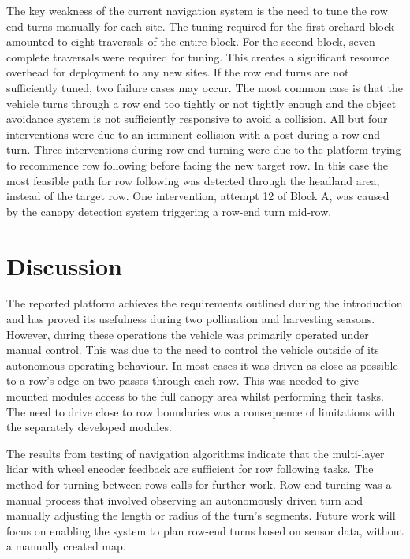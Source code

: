\documentclass[preprint,authoryear,12pt]{elsarticle}
\begin{document}
    The key weakness of the current navigation system is the need to tune the row end turns manually for each site.
    The tuning required for the first orchard block amounted to eight traversals of the entire block.
    For the second block, seven complete traversals were required for tuning.
    This creates a significant resource overhead for deployment to any new sites.
    If the row end turns are not sufficiently tuned, two failure cases may occur.
    The most common case is that the vehicle turns through a row end too tightly or not tightly enough and the object avoidance system is not sufficiently responsive to avoid a collision.
    All but four interventions were due to an imminent collision with a post during a row end turn.
    Three interventions during row end turning were due to the platform trying to recommence row following before facing the new target row.
    In this case the most feasible path for row following was detected through the headland area, instead of the target row.
    One intervention, attempt 12 of Block A, was caused by the canopy detection system triggering a row-end turn mid-row.

\section{Discussion}
\label{sect:discussion}

    The reported platform achieves the requirements outlined during the introduction and has proved its usefulness during two pollination and harvesting seasons.
    However, during these operations the vehicle was primarily operated under manual control.
    This was due to the need to control the vehicle outside of its autonomous operating behaviour.
    In most cases it was driven as close as possible to a row's edge on two passes through each row.
    This was needed to give mounted modules access to the full canopy area whilst performing their tasks.
    The need to drive close to row boundaries was a consequence of limitations with the separately developed modules.

    The results from testing of navigation algorithms indicate that the multi-layer lidar with wheel encoder feedback are sufficient for row following tasks.
    The method for turning between rows calls for further work.
    Row end turning was a manual process that involved observing an autonomously driven turn and manually adjusting the length or radius of the turn's segments.
    Future work will focus on enabling the system to plan row-end turns based on sensor data, without a manually created map.
\end{document}
